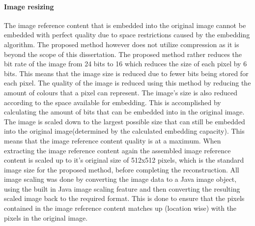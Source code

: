 \documentclass[12pt]{article}
\begin{document}
\paragraph{Image resizing}
\label{ImageCompression}
The image reference content that is embedded into the original image cannot be embedded with perfect quality due to space restrictions caused by the embedding algorithm. 
The proposed method however does not utilize compression as it is beyond the scope of this dissertation.
The proposed method rather reduces the bit rate of the image from 24 bits to 16 which reduces the size of each pixel by 6 bits.
This means that the image size is reduced due to fewer bits being stored for each pixel.
The quality of the image is reduced using this method by reducing the amount of colours that a pixel can represent.
The image's size is also reduced according to the space available for embedding.
This is accomplished by calculating the amount of bits that can be embedded into in the original image.
The image is scaled down to the largest possible size that can still be embedded into the original image(determined by the calculated embedding capacity).
This means that the image reference content quality is at a maximum. 
When extracting the image reference content again the assembled image reference content is scaled up to it's original size of 512x512 pixels, which is the standard image size for the proposed method, before completing the reconstruction.
All image scaling was done by converting the image data to a Java image object, using the built in Java image scaling feature and then converting the resulting scaled image back to the required format.
This is done to ensure that the pixels contained in the image reference content matches up (location wise) with the pixels in the original image.
\end{document}
